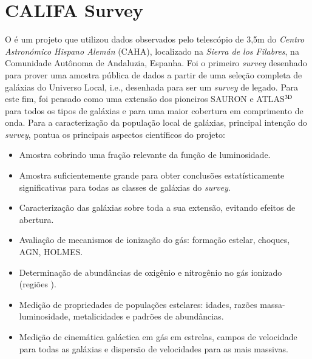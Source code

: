 

\section{CALIFA Survey}
\label{sec:sample:definicao}

O \CALS é um projeto que utilizou dados observados pelo telescópio de 3,5m do {\em Centro Astronómico Hispano Alemán} (CAHA), localizado na {\em Sierra de los Filabres}, na Comunidade Autônoma de Andaluzia, Espanha. Foi o primeiro {\em survey} desenhado para prover uma amostra pública de dados a partir de uma seleção completa de galáxias do Universo Local, i.e., desenhada para ser um {\em survey} de legado. Para este fim, foi pensado como uma extensão dos pioneiros SAURON e ATLAS${}^{\rm 3D}$ \citep{Cappellari.etal.2011} para todos os tipos de galáxias e para uma maior cobertura em comprimento de onda. Para a caracterização da população local de galáxias, principal intenção do {\em survey}, \citet{Sanchez.etal.2012a} pontua os principais aspectos científicos do projeto:

\begin{itemize}
  \item Amostra cobrindo uma fração relevante da função de luminosidade.
  \item Amostra suficientemente grande para obter conclusões estatísticamente significativas para todas as classes de galáxias do {\em survey}.
  \item Caracterização das galáxias sobre toda a sua extensão, evitando efeitos de abertura.
  \item Avaliação de mecanismos de ionização do gás: formação estelar, choques, AGN, HOLMES.
  \item Determinação de abundâncias de oxigênio e nitrogênio no gás ionizado (regiões \HII).
  \item Medição de propriedades de populações estelares: idades, razões massa-luminosidade, metalicidades e padrões de abundâncias.
  \item Medição de cinemática galáctica em gás em estrelas, campos de velocidade para todas as galáxias e dispersão de velocidades para as mais massivas.
\end{itemize}

